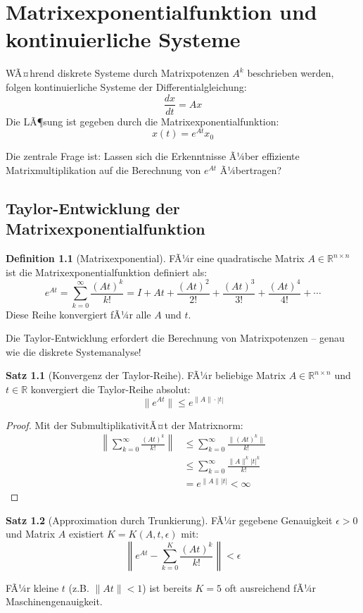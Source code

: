 ﻿\documentclass[a4paper,12pt]{report}
\theoremstyle{definition}
\newtheorem{definition}{Definition}
\newtheorem{satz}{Satz}
\begin{document}
	\chapter{Matrixexponentialfunktion und kontinuierliche Systeme}
	
	WÃ¤hrend diskrete Systeme durch Matrixpotenzen $A^k$ beschrieben werden, folgen kontinuierliche Systeme der Differentialgleichung:
	\[
	\frac{dx}{dt} = A x
	\]
	Die LÃ¶sung ist gegeben durch die Matrixexponentialfunktion:
	\[
	x(t) = e^{At} x_0
	\]
	
	Die zentrale Frage ist: Lassen sich die Erkenntnisse Ã¼ber effiziente Matrixmultiplikation auf die Berechnung von $e^{At}$ Ã¼bertragen?
	
	\section{Taylor-Entwicklung der Matrixexponentialfunktion}
	
	\begin{definition}[Matrixexponential]
		FÃ¼r eine quadratische Matrix $A \in \mathbb{R}^{n \times n}$ ist die Matrixexponentialfunktion definiert als:
		\[
		e^{At} = \sum_{k=0}^{\infty} \frac{(At)^k}{k!} = I + At + \frac{(At)^2}{2!} + \frac{(At)^3}{3!} + \frac{(At)^4}{4!} + \cdots
		\]
		Diese Reihe konvergiert fÃ¼r alle $A$ und $t$.
	\end{definition}
	
	Die Taylor-Entwicklung erfordert die Berechnung von Matrixpotenzen -- genau wie die diskrete Systemanalyse!
	
	\begin{satz}[Konvergenz der Taylor-Reihe]
		FÃ¼r beliebige Matrix $A \in \mathbb{R}^{n \times n}$ und $t \in \mathbb{R}$ konvergiert die Taylor-Reihe absolut:
		\[
		\|e^{At}\| \leq e^{\|A\| \cdot |t|}
		\]
	\end{satz}
	
	\begin{proof}
		Mit der SubmultiplikativitÃ¤t der Matrixnorm:
		\begin{align}
			\left\| \sum_{k=0}^{\infty} \frac{(At)^k}{k!} \right\| &\leq \sum_{k=0}^{\infty} \frac{\|(At)^k\|}{k!} \\
			&\leq \sum_{k=0}^{\infty} \frac{\|A\|^k |t|^k}{k!} \\
			&= e^{\|A\| |t|} < \infty
		\end{align}
	\end{proof}
	
	\begin{satz}[Approximation durch Trunkierung]
		FÃ¼r gegebene Genauigkeit $\epsilon > 0$ und Matrix $A$ existiert $K = K(A, t, \epsilon)$ mit:
		\[
		\left\| e^{At} - \sum_{k=0}^{K} \frac{(At)^k}{k!} \right\| < \epsilon
		\]
		
		FÃ¼r kleine $t$ (z.B. $\|At\| < 1$) ist bereits $K = 5$ oft ausreichend fÃ¼r Maschinengenauigkeit.
	\end{satz}
	
\end{document}
